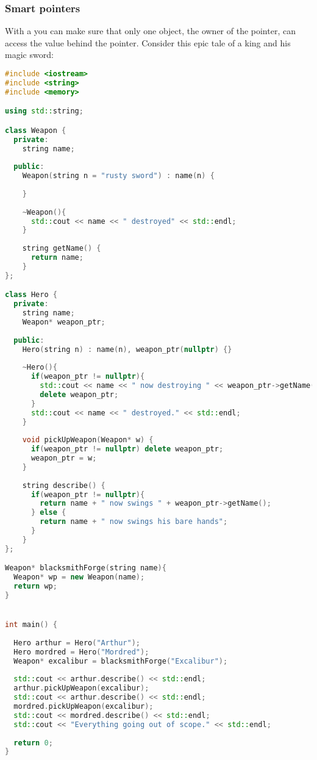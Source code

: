 \subsubsection{Smart pointers}
With a  you can make sure that only one object, the owner of the pointer, can access the value behind the pointer. Consider this epic tale of a king and his magic sword: 
\begin{lstlisting}[language=c++]
#include <iostream>
#include <string>
#include <memory>

using std::string;

class Weapon {
  private:
    string name;
  
  public:
    Weapon(string n = "rusty sword") : name(n) {
    
    }
    
    ~Weapon(){
      std::cout << name << " destroyed" << std::endl;
    }
    
    string getName() {
      return name;
    }
};

class Hero {
  private:
    string name;
    Weapon* weapon_ptr;
  
  public:
    Hero(string n) : name(n), weapon_ptr(nullptr) {}
    
    ~Hero(){
      if(weapon_ptr != nullptr){ 
        std::cout << name << " now destroying " << weapon_ptr->getName() << std::endl;
        delete weapon_ptr;
      }
      std::cout << name << " destroyed." << std::endl;
    }
    
    void pickUpWeapon(Weapon* w) {
      if(weapon_ptr != nullptr) delete weapon_ptr;
      weapon_ptr = w;
    }
    
    string describe() {
      if(weapon_ptr != nullptr){
        return name + " now swings " + weapon_ptr->getName();
      } else {
        return name + " now swings his bare hands";
      }
    }
};

Weapon* blacksmithForge(string name){
  Weapon* wp = new Weapon(name);
  return wp;
}


int main() {
  
  Hero arthur = Hero("Arthur");
  Hero mordred = Hero("Mordred");
  Weapon* excalibur = blacksmithForge("Excalibur");
  
  std::cout << arthur.describe() << std::endl;
  arthur.pickUpWeapon(excalibur);
  std::cout << arthur.describe() << std::endl;
  mordred.pickUpWeapon(excalibur);
  std::cout << mordred.describe() << std::endl;
  std::cout << "Everything going out of scope." << std::endl;
  
  return 0;
}
\end{lstlisting}

